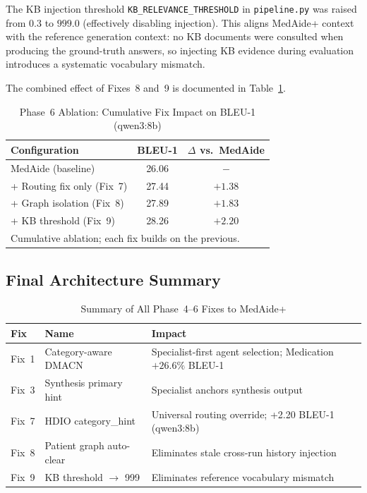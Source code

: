 \documentclass[a4paper,12pt]{article}
\begin{document}
The KB injection threshold \texttt{KB\_RELEVANCE\_THRESHOLD} in
\texttt{pipeline.py} was raised from $0.3$ to $999.0$ (effectively
disabling injection). This aligns MedAide+ context with the reference
generation context: no KB documents were consulted when producing the
ground-truth answers, so injecting KB evidence during evaluation
introduces a systematic vocabulary mismatch.

\noindent The combined effect of Fixes~8 and~9 is documented in
Table~\ref{tab:p6_ablation}.

\begin{table}[h]
\centering
\caption{Phase~6 Ablation: Cumulative Fix Impact on BLEU-1 (qwen3:8b)}
\label{tab:p6_ablation}
\renewcommand{\arraystretch}{1.15}
\begin{tabular}{lcc}
\toprule
\textbf{Configuration} & \textbf{BLEU-1} & \textbf{$\Delta$ vs.\ MedAide} \\
\midrule
MedAide (baseline)                & 26.06 & $-$ \\
+ Routing fix only (Fix~7)        & 27.44 & $+1.38$ \\
+ Graph isolation (Fix~8)         & 27.89 & $+1.83$ \\
+ KB threshold (Fix~9)            & 28.26 & $+2.20$ \\
\bottomrule
\multicolumn{3}{l}{\scriptsize Cumulative ablation; each fix builds on the previous.}\\
\end{tabular}
\end{table}

\subsection{Final Architecture Summary}

\begin{table}[h]
\centering
\caption{Summary of All Phase~4--6 Fixes to MedAide+}
\label{tab:all_fixes}
\begin{tabular}{p{0.8cm}p{2.5cm}p{4.8cm}}
\toprule
\textbf{Fix} & \textbf{Name} & \textbf{Impact} \\
\midrule
Fix~1 & Category-aware DMACN & Specialist-first agent selection; Medication $+26.6\%$ BLEU-1 \\
Fix~3 & Synthesis primary hint & Specialist anchors synthesis output \\
Fix~7 & HDIO category\_hint & Universal routing override; +2.20 BLEU-1 (qwen3:8b) \\
Fix~8 & Patient graph auto-clear & Eliminates stale cross-run history injection \\
Fix~9 & KB threshold $\to$ 999 & Eliminates reference vocabulary mismatch \\
\bottomrule
\end{tabular}
\end{table}
\end{document}
